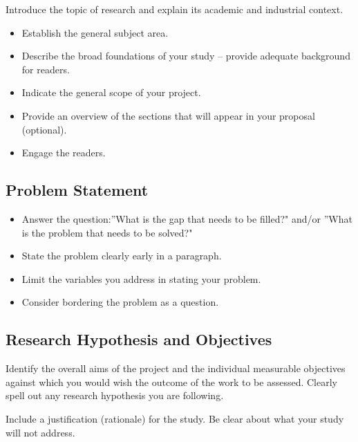 Introduce the topic of research and explain its academic and industrial context.

\begin{itemize}
    \item Establish the general subject area.
    \item Describe the broad foundations of your study -- provide adequate background for readers.
    \item Indicate the general scope of your project.
    \item Provide an overview of the sections that will appear in your proposal (optional).
    \item Engage the readers.
\end{itemize}

\subsection{Problem Statement}

\begin{itemize}
    \item Answer the question:''What is the gap that needs to be filled?"
    and/or ''What is the problem that needs to be solved?"
    \item State the problem clearly early in a paragraph.
    \item Limit the variables you address in stating your problem.
    \item Consider bordering the problem as a question.
\end{itemize}

\subsection{Research Hypothesis and Objectives}

Identify the overall aims of the project and the individual measurable objectives against which you would wish the outcome of the work to be assessed. Clearly spell out any research hypothesis you are following.

Include a justification (rationale) for the study. Be clear about what your study will not address.


